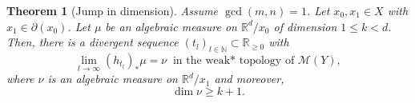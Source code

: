 \documentclass[reqno,11pt, twoside]{amsart}
\theoremstyle{plain}
\newtheorem{thm}{Theorem}[section]
\theoremstyle{definition}
\theoremstyle{definition}
\theoremstyle{remark}
\numberwithin{equation}{section}
\newcommand{\R}{{\mathbb{R}}}
\newcommand{\N}{{\mathbb{N}}}
\newcommand{\bR}{\mathbb{R}}
\begin{document}
\begin{thm}[Jump in dimension]\label{thm: ht limits must jump}
    Assume $\gcd(m,n) =1$. Let $x_0, x_1 \in X$ with $x_1 \in \partial(x_0)$. Let $\mu$ be an algebraic measure on $\bR^d/x_0$ of dimension $1\le k<d$.
    Then, there is a divergent sequence $(t_l)_{l \in \N} \subset \R_{\geq 0}$ with
    \begin{equation*}
        \lim_{l \to \infty} (h_{t_l})_* \mu = \nu \ \text{ in the weak* topology of } \mathcal{M}(Y),
    \end{equation*}
    where $\nu$ is an algebraic measure on $\bR^d/x_1$ and moreover, 
    \begin{equation}\label{eq: dimension jump by 1}
        \dim \nu \geq k+1.
    \end{equation}
\end{thm}
\end{document}
